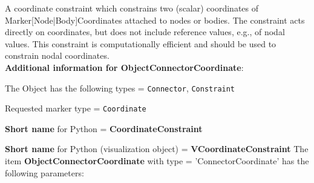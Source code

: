 \label{sec:item:ObjectConnectorCoordinate}
A coordinate constraint which constrains two (scalar) coordinates of Marker[Node|Body]Coordinates attached to nodes or bodies. The constraint acts directly on coordinates, but does not include reference values, e.g., of nodal values. This constraint is computationally efficient and should be used to constrain nodal coordinates.\vspace{12pt}
 \\{\bf Additional information for ObjectConnectorCoordinate}:
\bi
  \item The Object has the following types = \texttt{Connector}, \texttt{Constraint}
  \item Requested marker type = \texttt{Coordinate}
  \item {\bf Short name} for Python = {\bf CoordinateConstraint}  \item {\bf Short name} for Python (visualization object) = {\bf VCoordinateConstraint}\ei
\vspace{12pt} \noindent The item {\bf ObjectConnectorCoordinate} with type = 'ConnectorCoordinate' has the following parameters:\vspace{-1cm}\\ 
